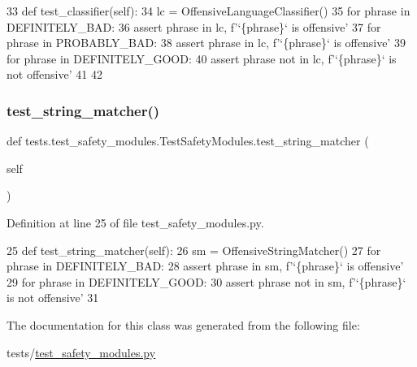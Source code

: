 \begin{DoxyCode}
33     \textcolor{keyword}{def }test\_classifier(self):
34         lc = OffensiveLanguageClassifier()
35         \textcolor{keywordflow}{for} phrase \textcolor{keywordflow}{in} DEFINITELY\_BAD:
36             \textcolor{keyword}{assert} phrase \textcolor{keywordflow}{in} lc, f\textcolor{stringliteral}{'`\{phrase\}` is offensive'}
37         \textcolor{keywordflow}{for} phrase \textcolor{keywordflow}{in} PROBABLY\_BAD:
38             \textcolor{keyword}{assert} phrase \textcolor{keywordflow}{in} lc, f\textcolor{stringliteral}{'`\{phrase\}` is offensive'}
39         \textcolor{keywordflow}{for} phrase \textcolor{keywordflow}{in} DEFINITELY\_GOOD:
40             \textcolor{keyword}{assert} phrase \textcolor{keywordflow}{not} \textcolor{keywordflow}{in} lc, f\textcolor{stringliteral}{'`\{phrase\}` is not offensive'}
41 
42 
\end{DoxyCode}
\mbox{\label{classtests_1_1test__safety__modules_1_1TestSafetyModules_aed1e2df090eb0fd87202030400adf2a3}} 
\subsubsection{\texorpdfstring{test\+\_\+string\+\_\+matcher()}{test\_string\_matcher()}}
{\footnotesize\ttfamily def tests.\+test\+\_\+safety\+\_\+modules.\+Test\+Safety\+Modules.\+test\+\_\+string\+\_\+matcher (\begin{DoxyParamCaption}\item[{}]{self }\end{DoxyParamCaption})}



Definition at line 25 of file test\+\_\+safety\+\_\+modules.\+py.


\begin{DoxyCode}
25     \textcolor{keyword}{def }test\_string\_matcher(self):
26         sm = OffensiveStringMatcher()
27         \textcolor{keywordflow}{for} phrase \textcolor{keywordflow}{in} DEFINITELY\_BAD:
28             \textcolor{keyword}{assert} phrase \textcolor{keywordflow}{in} sm, f\textcolor{stringliteral}{'`\{phrase\}` is offensive'}
29         \textcolor{keywordflow}{for} phrase \textcolor{keywordflow}{in} DEFINITELY\_GOOD:
30             \textcolor{keyword}{assert} phrase \textcolor{keywordflow}{not} \textcolor{keywordflow}{in} sm, f\textcolor{stringliteral}{'`\{phrase\}` is not offensive'}
31 
\end{DoxyCode}


The documentation for this class was generated from the following file\+:\begin{DoxyCompactItemize}
\item 
tests/\hyperlink{test__safety__modules_8py}{test\+\_\+safety\+\_\+modules.\+py}\end{DoxyCompactItemize}
